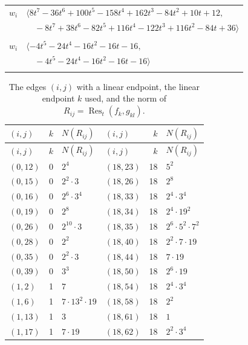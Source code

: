 \documentclass[11pt]{article}
\begin{document}
\begin{longtable}{@{}ll@{}}
$w_i$ & $\langle 8t^{7}-36t^{6}+100t^{5}-158t^{4}+162t^{3}-84t^{2}+10t+12,$\\
 & $\quad -8t^{7}+38t^{6}-82t^{5}+116t^{4}-122t^{3}+116t^{2}-84t+36\rangle$\\
\addlinespace[2pt]
\multicolumn{2}{@{}p{0.97\textwidth}@{}}{$i=62$, $D_i=4$, $\rho_{ij}$: $18{:}2, \allowbreak 33{:}1, \allowbreak 42{:}1, \allowbreak 43{:}1, \allowbreak 56{:}2, \allowbreak 57{:}2, \allowbreak 61{:}1$}\\
$w_i$ & $\langle -4t^{5}-24t^{4}-16t^{2}-16t-16,$\\
 & $\quad -4t^{5}-24t^{4}-16t^{2}-16t-16\rangle$\\
\addlinespace[2pt]
\end{longtable}
\endgroup

\begingroup\small
\setlength{\LTcapwidth}{\textwidth}
\begin{longtable}{@{}lrl@{\qquad}lrl@{}}
\caption{The edges $(i,j)$ with a linear endpoint, the linear endpoint $k$ used, and the norm of $R_{ij}=\operatorname{Res}_t(f_k,g_{kl})$.}\label{tab:csep}\\
\hline $(i,j)$ & $k$ & $N(R_{ij})$ & $(i,j)$ & $k$ & $N(R_{ij})$\\\hline\endfirsthead\hline $(i,j)$ & $k$ & $N(R_{ij})$ & $(i,j)$ & $k$ & $N(R_{ij})$\\\hline\endhead\hline\endfoot
$(0,12)$ & 0 & $2^{4}$ & $(18,23)$ & 18 & $5^{2}$\\
$(0,15)$ & 0 & $2^{2}\cdot 3$ & $(18,26)$ & 18 & $2^{8}$\\
$(0,16)$ & 0 & $2^{6}\cdot 3^{4}$ & $(18,33)$ & 18 & $2^{4}\cdot 3^{4}$\\
$(0,19)$ & 0 & $2^{8}$ & $(18,34)$ & 18 & $2^{4}\cdot 19^{2}$\\
$(0,26)$ & 0 & $2^{10}\cdot 3$ & $(18,35)$ & 18 & $2^{6}\cdot 5^{2}\cdot 7^{2}$\\
$(0,28)$ & 0 & $2^{2}$ & $(18,40)$ & 18 & $2^{2}\cdot 7\cdot 19$\\
$(0,35)$ & 0 & $2^{2}\cdot 3$ & $(18,44)$ & 18 & $7\cdot 19$\\
$(0,39)$ & 0 & $3^{3}$ & $(18,50)$ & 18 & $2^{6}\cdot 19$\\
$(1,2)$ & 1 & $7$ & $(18,54)$ & 18 & $2^{4}\cdot 3^{4}$\\
$(1,6)$ & 1 & $7\cdot 13^{2}\cdot 19$ & $(18,58)$ & 18 & $2^{2}$\\
$(1,13)$ & 1 & $3$ & $(18,61)$ & 18 & $1$\\
$(1,17)$ & 1 & $7\cdot 19$ & $(18,62)$ & 18 & $2^{2}\cdot 3^{4}$\\

\end{longtable}
\end{document}
